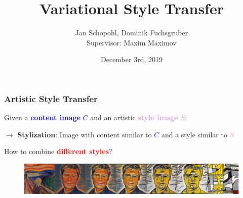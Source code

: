 \documentclass[11pt,xcolor=dvipsnames]{beamer}
\author[Jan Schopohl, Dominik Fuchsgruber]{Jan Schopohl, Dominik Fuchsgruber \\[10mm]{\small Supervisor: Maxim Maximov}}
\title{Variational Style Transfer}
\date{December 3rd, 2019}
\institute{Department of Informatics, Technical University of Munich}
\begin{document}
\begin{frame}
\titlepage
\end{frame}



\begin{frame}
	
\frametitle{Artistic Style Transfer}


\begin{multicols*}{2}
\begin{large}
Given a \textcolor{blue}{\textbf{content image} $C$} and an artistic \textcolor{Plum}{\textbf{style image $S$}}: 


\vspace{20pt}

$\rightarrow$ \textbf{Stylization}: Image with content similar to \textcolor{blue}{\textbf{$C$}} and a style similar to \textcolor{Plum}{\textbf{$S$}} 

\vspace{40pt}

How to combine \textcolor{red}{\textbf{different styles}}?
\end{large}

\begin{figure}
\includegraphics[scale=0.2]{interpolation.png}
\end{figure}

\columnbreak


\end{multicols*}
\end{frame}
\end{document}
